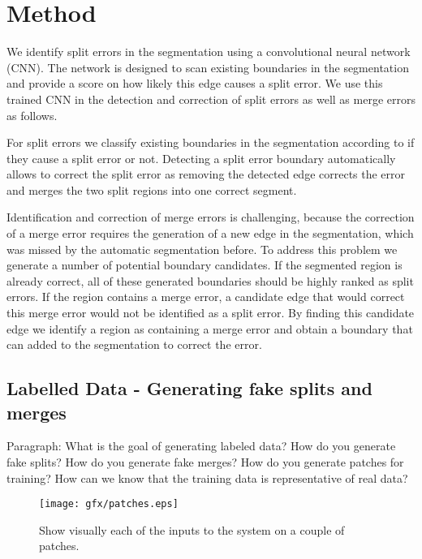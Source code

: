 \section{Method}
We identify split errors in the segmentation using a convolutional neural network (CNN). The network is designed to scan existing boundaries in the segmentation and provide a score on how likely this edge causes a split error. We use this trained CNN in the detection and correction of split errors as well as merge errors as follows.

For split errors we classify existing boundaries in the segmentation according to if they cause a split error or not. Detecting a split error boundary automatically allows to correct the split error as removing the detected edge corrects the error and merges the two split regions into one correct segment. 

Identification and correction of merge errors is challenging, because the correction of a merge error requires the generation of a new edge in the segmentation, which was missed by the automatic segmentation before. To address this problem we generate a number  of potential boundary candidates. If the segmented region is already correct, all of these generated boundaries should be highly ranked as split errors. If the region contains a merge error, a candidate edge that would correct this merge error would not be identified as a split error. By finding this candidate edge we identify a region as containing a merge error and obtain a boundary that can added to the segmentation to correct the error. 

\subsection{Labelled Data - Generating fake splits and merges}

Paragraph: What is the goal of generating labeled data? How do you generate fake splits? How do you generate fake merges? How do you generate patches for training? How can we know that the training data is representative of real data?

\begin{figure}
\texttt{[image: gfx/patches.eps]}
\caption{Show visually each of the inputs to the system on a couple of patches.}
\end{figure}


